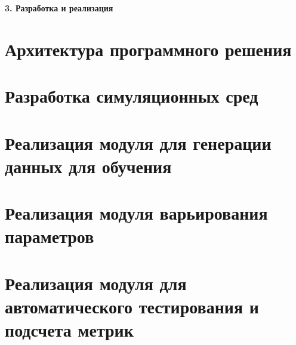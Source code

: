 \newpage
\begin{center}
  \textbf{\large 3. Разработка и реализация}
\end{center}

\section{Архитектура программного решения}
\section{Разработка симуляционных сред}
\section{Реализация модуля для генерации данных для обучения}
\section{Реализация модуля варьирования параметров}
\section{Реализация модуля для автоматического тестирования и подсчета метрик}